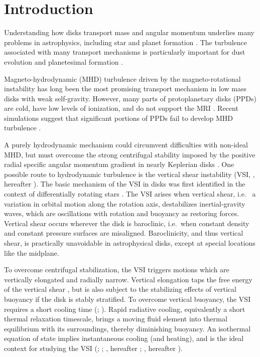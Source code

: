 \documentclass[iop]{emulateapj}
\begin{document}
\section{Introduction}\label{intro}
Understanding how disks transport mass and angular momentum underlies 
many problems in astrophysics, including star and planet formation  
\citep[][]{lyndenbell74, armitage10}.  The turbulence associated with many transport mechanisms
is particularly important for dust evolution and planetesimal formation \citep{yl07, chiang10}. 

Magneto-hydrodynamic (MHD) turbulence driven by
the magneto-rotational instability \citep[MRI,][]{balbus91} has long been the most
promising transport mechanism in low mass disks with weak self-gravity. 
However, many parts of protoplanetary  
disks (PPDs) are cold, have low levels of ionization, and do not support the MRI 
\citep{blaes94,salmeron03}. Recent simulations
suggest that significant portions of PPDs fail to develop MHD
turbulence \citep[e.g.][]{simon13, lesur14,bai15,gressel15}. 

A purely hydrodynamic mechanism could circumvent difficulties with non-ideal MHD, but must overcome
the strong centrifugal stability imposed by the positive radial specific angular
momentum gradient in nearly Keplerian disks \citep{balbus96}.
One possible route to hydrodynamic turbulence is the vertical shear
instability (VSI, \citealp{urpin98, urpin03, nelson13}, hereafter ).  The
basic mechanism of the VSI  in disks was first 
identified in the context of differentially rotating stars \citep[][]{goldreich67,fricke68}.   
The VSI arises when vertical shear, i.e. \ a variation in orbital motion along the rotation axis, 
destabilizes inertial-gravity waves, which are oscillations 
with rotation and buoyancy as restoring forces. Vertical shear
occurs wherever the disk is baroclinic, i.e.\ when constant 
density and constant pressure surfaces are misaligned.  Baroclinicity, and thus vertical shear, is 
practically unavoidable in astrophysical disks, except at special locations like the
midplane. 

To overcome centrifugal stabilization, the VSI triggers motions which are vertically elongated 
and radially narrow.  %
Vertical elongation taps the free energy of the vertical shear \citep{umurhan13}, but is also subject to 
the stabilizing effects of vertical buoyancy if the disk is stably
stratified. To overcome vertical buoyancy, the VSI requires a short cooling time
(\citealp{goldreich67}; ). Rapid radiative 
cooling, equivalently a short thermal relaxation timescale, brings a
moving fluid element into thermal equilibrium with 
its surroundings, thereby diminishing buoyancy. %
An isothermal equation of state implies instantaneous cooling (and
heating), and is the ideal context for studying the VSI
(\citealp{urpin03}; ; \citealp{mcnally14}, hereafter ; \citealp{barker15},
hereafter ).    
\end{document}
